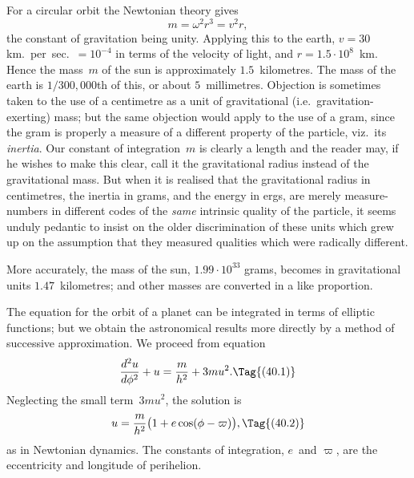 \documentclass[12pt]{book}
\begin{document}
For a circular orbit the Newtonian theory gives
\[
m = \omega^{2} r^{3} = v^{2} r,
\]
the constant of gravitation being unity. Applying this to the earth, $v = 30$ km.\
per~sec.\ $= 10^{-4}$ in terms of the velocity of light, and $r = 1.5 \cdot 10^{8}$~km. Hence
the mass~$m$ of the sun is approximately $1.5$~kilometres. The mass of the earth
is $1/300,000$th of this, or about $5$~millimetres\footnotemark.\footnotetext
  {Objection is sometimes taken to the use of a centimetre as a unit of gravitational (i.e.\
  gravitation-exerting) mass; but the same objection would apply to the use of a gram, since the
  gram is properly a measure of a different property of the particle, viz.\ its \emph{inertia}. Our constant
  of integration~$m$ is clearly a length and the reader may, if he wishes to make this clear, call it
  the gravitational radius instead of the gravitational mass. But when it is realised that the gravitational
  radius in centimetres, the inertia in grams, and the energy in ergs, are merely measure-numbers
  in different codes of the \emph{same} intrinsic quality of the particle, it seems unduly pedantic
  to insist on the older discrimination of these units which grew up on the assumption that they
  measured qualities which were radically different.}

  More accurately, the mass of the sun, $1.99 \cdot 10^{33}$ grams, becomes in gravitational
%
\index{Sun, gravitational mass of}%
  units $1.47$~kilometres; and other masses are converted in a like
proportion.
\PageSep{88}

%

The equation  for the orbit of a planet can be integrated in terms
of elliptic functions; but we obtain the astronomical results more directly by
a method of successive approximation. We proceed from equation~\Eq{(39.61)}
\[
\frac{d^{2}u}{d\phi^{2}} + u = \frac{m}{h^{2}} + 3mu^{2}.
\Tag{(40.1)}
\]
Neglecting the small term~$3mu^{2}$, the solution is
\[
u = \frac{m}{h^{2}} \bigl(1 + e\cos(\phi - \varpi)\bigr),
\Tag{(40.2)}
\]
as in Newtonian dynamics. The constants of integration, $e$~and $\varpi$, are the
eccentricity and longitude of perihelion.
\end{document}
